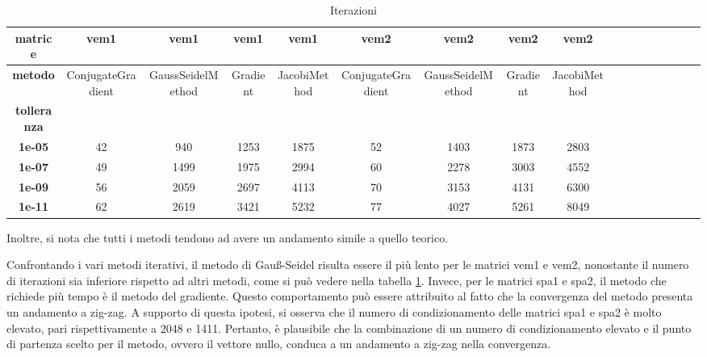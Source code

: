 \begin{table}[!ht]
\begin{subtable}[!ht]{1\textwidth}
{\begin{tabular}{|c|c|c|c|c|c|c|c|c|c|c|c|c|c|c|c|c|}
                \textbf{matrice}    & \textbf{vem1}     & \textbf{vem1}     & \textbf{vem1} & \textbf{vem1} & \textbf{vem2}     & \textbf{vem2}     & \textbf{vem2} & \textbf{vem2} \\ \hline
                \textbf{metodo}     & ConjugateGradient & GaussSeidelMethod & Gradient      & JacobiMethod  & ConjugateGradient & GaussSeidelMethod & Gradient      & JacobiMethod  \\
                \textbf{tolleranza} & ~                 & ~                 & ~             & ~             & ~                 & ~                 & ~             & ~             \\
                \textbf{1e-05}      & 42                & 940               & 1253          & 1875          & 52                & 1403              & 1873          & 2803          \\
                \textbf{1e-07}      & 49                & 1499              & 1975          & 2994          & 60                & 2278              & 3003          & 4552          \\
                \textbf{1e-09}      & 56                & 2059              & 2697          & 4113          & 70                & 3153              & 4131          & 6300          \\
                \textbf{1e-11}      & 62                & 2619              & 3421          & 5232          & 77                & 4027              & 5261          & 8049          \\
            \end{tabular}}
        \caption{Vem 1 e Vem 2}
        \label{tab:vem}
    \end{subtable}
    \caption{Iterazioni}
    \label{tab:iterazioni}
\end{table}
Inoltre, si nota che tutti i metodi tendono ad avere un andamento simile a quello
teorico.

Confrontando i vari metodi iterativi, il metodo di Gauß-Seidel risulta essere il
più lento per le matrici vem1 e vem2, nonostante il numero di iterazioni sia
inferiore rispetto ad altri metodi, come si può vedere nella tabella \ref{tab:iterazioni}.
Invece, per le matrici spa1 e spa2, il metodo che richiede più tempo è il metodo
del gradiente. Questo comportamento può essere attribuito al fatto che la convergenza
del metodo presenta un andamento a zig-zag. A supporto di questa ipotesi, si
osserva che il numero di condizionamento delle matrici spa1 e spa2 è molto elevato,
pari rispettivamente a 2048 e 1411. Pertanto, è plausibile che la combinazione
di un numero di condizionamento elevato e il punto di partenza scelto per il
metodo, ovvero il vettore nullo, conduca a un andamento a zig-zag nella convergenza.

